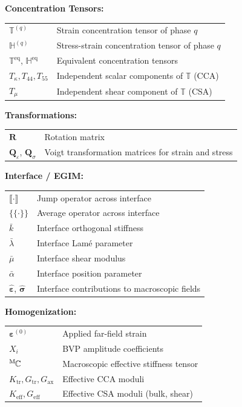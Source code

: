 \documentclass[oneside, 12pt, a4paper, bibliography=totoc]{book}
\newcommand{\jump}[1]{\llbracket #1 \rrbracket}    %
\newcommand{\bs}[1]{\bm{#1}}                       %
\begin{document}
\vspace{0.6cm}

\textbf{Concentration Tensors:}
\begin{tabular}{@{}p{2.5cm}p{10cm}@{}}
$\mathbb{T}^{(q)}$ & Strain concentration tensor of phase $q$ \\[0.3em]
$\mathbb{H}^{(q)}$ & Stress-strain concentration tensor of phase $q$ \\[0.3em]
$\mathbb{T}^{\text{eq}}$, $\mathbb{H}^{\text{eq}}$ & Equivalent concentration tensors \\[0.3em]
$T_\kappa, T_{44}, T_{55}$ & Independent scalar components of $\mathbb{T}$ (CCA) \\[0.3em]
$T_\mu$ & Independent shear component of $\mathbb{T}$ (CSA) \\[0.3em]
\end{tabular}

\vspace{0.6cm}

\textbf{Transformations:}
\begin{tabular}{@{}p{2.5cm}p{10cm}@{}}
$\bs{R}$ & Rotation matrix \\[0.3em]
$\bs{Q}_\varepsilon$, $\bs{Q}_\sigma$ & Voigt transformation matrices for strain and stress \\[0.3em]
\end{tabular}

\vspace{0.6cm}

\textbf{Interface / EGIM:}
\begin{tabular}{@{}p{2.5cm}p{10cm}@{}}
$\jump{\cdot}$ & Jump operator across interface \\[0.3em]
$\{\!\{ \cdot \}\!\}$ & Average operator across interface \\[0.3em]
$\bar{k}$ & Interface orthogonal stiffness \\[0.3em]
$\bar{\lambda}$ & Interface Lam\'{e} parameter \\[0.3em]
$\bar{\mu}$ & Interface shear modulus \\[0.3em]
$\bar{\alpha}$ & Interface position parameter \\[0.3em]
$\hat{\bs{\varepsilon}}$, $\hat{\bs{\sigma}}$ & Interface contributions to macroscopic fields \\[0.3em]
\end{tabular}

\vspace{0.6cm}

\textbf{Homogenization:}
\begin{tabular}{@{}p{2.5cm}p{10cm}@{}}
$\bs{\varepsilon}^{(0)}$ & Applied far-field strain \\[0.3em]
$X_i$ & BVP amplitude coefficients \\[0.3em]
${}^{\mathrm{M}}\hspace{-1pt}\mathbb{C}$ & Macroscopic effective stiffness tensor \\[0.3em]
$K_{\text{tr}}, G_{\text{tr}}, G_{\text{ax}}$ & Effective CCA moduli  \\[0.3em]
$K_{\text{eff}}, G_{\text{eff}}$ & Effective CSA moduli (bulk, shear) \\[0.3em]
\end{tabular}
\end{document}
